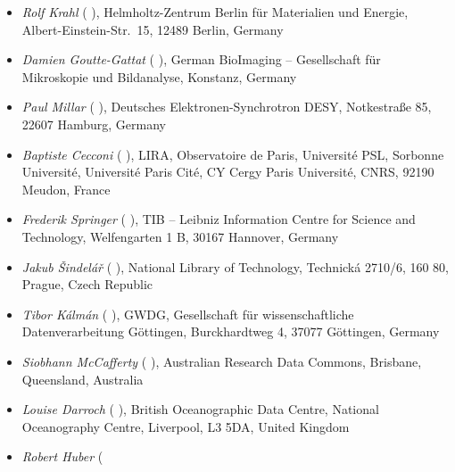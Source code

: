 \documentclass[titlepage=true,twoside=false,DIV=13]{scrartcl}
\begin{document}
\begin{itemize}\emergencystretch 3em
\item \emph{Rolf Krahl}
  (\href{mailto:rolf.krahl@helmholtz-berlin.de}{\Letter}
   ),
  Helmholtz-Zentrum Berlin für Materialien und Energie,
  Albert-Einstein-Str.\ 15, 12489 Berlin, Germany
\item \emph{Damien Goutte-Gattat}
  (\href{mailto:damien@gerbi-gmb.de}{\Letter}
   ),
  German BioImaging – Gesellschaft für Mikroskopie und Bildanalyse,
  Konstanz, Germany
\item \emph{Paul Millar}
  (\href{mailto:paul.millar@desy.de}{\Letter}
   ),
  Deutsches Elektronen-Synchrotron DESY,
  Notkestraße 85, 22607 Hamburg, Germany
\item \emph{Baptiste Cecconi}
  (\href{mailto:baptiste.cecconi@obspm.fr}{\Letter}
   ),
  LIRA, Observatoire de Paris, Université PSL, Sorbonne Université,
  Université Paris Cité, CY Cergy Paris Université, CNRS, 92190
  Meudon, France
\item \emph{Frederik Springer}
  (\href{mailto:frederik.springer@tib.eu}{\Letter}
   ),
  TIB -- Leibniz Information Centre for Science and Technology,
  Welfengarten 1 B, 30167 Hannover, Germany
\item \emph{Jakub Šindelář}
  (\href{mailto:jakub.sindelar@techlib.cz}{\Letter}
   ),
  National Library of Technology,
  Technická 2710/6, 160 80, Prague, Czech Republic
\item \emph{Tibor Kálmán}
  (\href{mailto:tibor.kalman@gwdg.de}{\Letter}
   ),
  GWDG, Gesellschaft für wissenschaftliche Datenverarbeitung
  Göttingen, Burckhardtweg 4, 37077 Göttingen, Germany
\item \emph{Siobhann McCafferty}
  ( ),
  Australian Research Data Commons, Brisbane, Queensland, Australia
\item \emph{Louise Darroch}
  (\href{mailto:lorr@noc.ac.uk}{\Letter}
   ),
  British Oceanographic Data Centre, National Oceanography Centre,
  Liverpool, L3 5DA, United Kingdom
\item \emph{Robert Huber}
  (\href{mailto:rhuber@uni-bremen.de}{\Letter}

\end{itemize}
\end{document}
